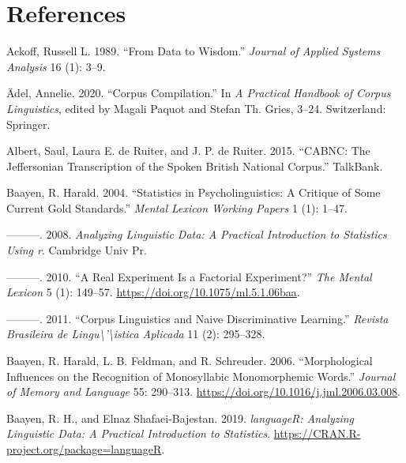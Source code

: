 \documentclass[
  letterpaper,
]{latex/krantz}
\newlength{\cslhangindent}
\newenvironment{CSLReferences}[2] %
 {\begin{list}{}{%
  \setlength{\itemindent}{0pt}
  \setlength{\leftmargin}{0pt}
  \setlength{\parsep}{0pt}
  \ifodd #1
   \setlength{\leftmargin}{\cslhangindent}
   \setlength{\itemindent}{-1\cslhangindent}
  \fi
  \setlength{\itemsep}{#2\baselineskip}}}
 {\end{list}}
\theoremstyle{definition}
\theoremstyle{remark}
\begin{document}

\chapter*{References}\label{references}


\label{refs}
\begin{CSLReferences}{1}{0}
Ackoff, Russell L. 1989. {``From Data to Wisdom.''} \emph{Journal of
Applied Systems Analysis} 16 (1): 3--9.

Ädel, Annelie. 2020. {``Corpus Compilation.''} In \emph{A Practical
Handbook of Corpus Linguistics}, edited by Magali Paquot and Stefan Th.
Gries, 3--24. Switzerland: Springer.

Albert, Saul, Laura E. de Ruiter, and J. P. de Ruiter. 2015. {``CABNC:
The Jeffersonian Transcription of the Spoken British National Corpus.''}
TalkBank.

Baayen, R. Harald. 2004. {``Statistics in Psycholinguistics: A Critique
of Some Current Gold Standards.''} \emph{Mental Lexicon Working Papers}
1 (1): 1--47.

---------. 2008. \emph{Analyzing Linguistic Data: A Practical
Introduction to Statistics Using r}. Cambridge Univ Pr.

---------. 2010. {``A Real Experiment Is a Factorial Experiment?''}
\emph{The Mental Lexicon} 5 (1): 149--57.
\url{https://doi.org/10.1075/ml.5.1.06baa}.

---------. 2011. {``Corpus Linguistics and Naive Discriminative
Learning.''} \emph{Revista Brasileira de
Lingu{\textbackslash{}}'{\textbackslash{}}istica Aplicada} 11 (2):
295--328.

Baayen, R. Harald, L. B. Feldman, and R. Schreuder. 2006.
{``Morphological Influences on the Recognition of Monosyllabic
Monomorphemic Words.''} \emph{Journal of Memory and Language} 55:
290--313. \url{https://doi.org/10.1016/j.jml.2006.03.008}.

Baayen, R. H., and Elnaz Shafaei-Bajestan. 2019. \emph{languageR:
Analyzing Linguistic Data: A Practical Introduction to Statistics}.
\url{https://CRAN.R-project.org/package=languageR}.


\end{CSLReferences}
\end{document}
